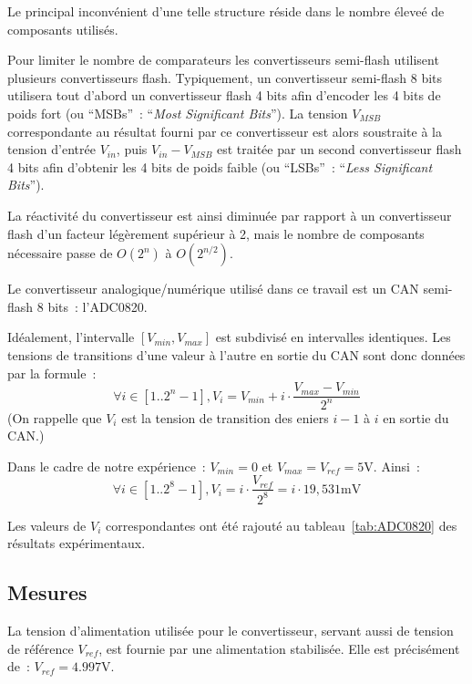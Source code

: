 \documentclass{article}
\begin{document}
Le principal inconvénient d'une telle structure réside dans le nombre éleveé de composants utilisés. 

Pour limiter le nombre de comparateurs les convertisseurs semi-flash utilisent plusieurs convertisseurs flash. Typiquement, un convertisseur semi-flash 8 bits utilisera tout d'abord un convertisseur flash 4 bits afin d'encoder les 4 bits de poids fort (ou ``MSBs''~: ``\textit{Most Significant Bits}''). La tension $V_{MSB}$ correspondante au résultat fourni par ce convertisseur est alors soustraite à la tension d'entrée $V_{in}$, puis $V_{in}-V_{MSB}$ est traitée par un second convertisseur flash 4 bits afin d'obtenir les 4 bits de poids faible (ou ``LSBs''~: ``\textit{Less Significant Bits}'').

La réactivité du convertisseur est ainsi diminuée par rapport à un convertisseur flash d'un facteur légèrement supérieur à 2, mais le nombre de composants nécessaire passe de $O(2^n)$ à $O(2^{n/2})$.

Le convertisseur analogique/numérique utilisé dans ce travail est un CAN semi-flash 8 bits~: l'ADC0820.



Idéalement, l'intervalle $[V_{min},V_{max}]$ est subdivisé en intervalles identiques. Les tensions de transitions d'une valeur à l'autre en sortie du CAN sont donc données par la formule~:
\begin{equation*}
\forall i\in[1..2^n-1], V_i = V_{min}+i\cdot\frac{V_{max}-V_{min}}{2^n}
\end{equation*}
(On rappelle que $V_i$ est la tension de transition des eniers $i-1$ à $i$ en sortie du CAN.)

Dans le cadre de notre expérience~: $V_{min}=0$ et $V_{max}=V_{ref}=\mathrm{5 V}$. Ainsi~:
\begin{equation*}
\forall i\in[1..2^8-1], V_i = i\cdot\frac{V_{ref}}{2^8} = i\cdot \mathrm{19,531 mV}
\end{equation*}

Les valeurs de $V_i$ correspondantes ont été rajouté au tableau~\ref{tab:ADC0820} des résultats expérimentaux.


\subsection{Mesures}


La tension d'alimentation utilisée pour le convertisseur, servant aussi de tension de référence $V_{ref}$, est fournie par une alimentation stabilisée. Elle est précisément de~: ${V_{ref}=\mathrm{4.997 V}}$.
\end{document}
